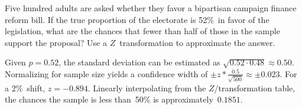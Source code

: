\begin{problem}
   Five hundred adults are asked whether they favor a bipartisan campaign finance reform bill. If the true proportion of the electorate is 52\%~in favor of the legislation, what are the chances that fewer than half of those in the sample support the proposal? Use a $Z$~transformation to approximate the answer.
\end{problem}

Given ${p=0.52}$, the standard deviation can be estimated as ${\sqrt{0.52 \cdot 0.48} \approx 0.50}$.  Normalizing for sample size yields a confidence width of ${\pm z * \frac{0.5}{\sqrt{500}} \approx \pm 0.023}$.  For a 2\%~shift, ${z=-0.894}$.  Linearly interpolating from the $Z$\-/transformation table, the chances the sample is less than~50\% is approximately~$\boxed{0.1851}$.
